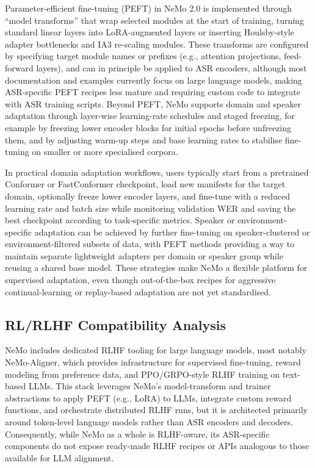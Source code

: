 \documentclass[conference]{IEEEtran}
\begin{document}
Parameter-efficient fine-tuning (PEFT) in NeMo 2.0 is implemented through ``model transforms'' that wrap selected modules at the start of training, turning standard linear layers into LoRA-augmented layers or inserting Houlsby-style adapter bottlenecks and IA3 re-scaling modules.
These transforms are configured by specifying target module names or prefixes (e.g., attention projections, feed-forward layers), and can in principle be applied to ASR encoders, although most documentation and examples currently focus on large language models, making ASR-specific PEFT recipes less mature and requiring custom code to integrate with ASR training scripts.
Beyond PEFT, NeMo supports domain and speaker adaptation through layer-wise learning-rate schedules and staged freezing, for example by freezing lower encoder blocks for initial epochs before unfreezing them, and by adjusting warm-up steps and base learning rates to stabilise fine-tuning on smaller or more specialised corpora.

In practical domain adaptation workflows, users typically start from a pretrained Conformer or FastConformer checkpoint, load new manifests for the target domain, optionally freeze lower encoder layers, and fine-tune with a reduced learning rate and batch size while monitoring validation WER and saving the best checkpoint according to task-specific metrics.
Speaker or environment-specific adaptation can be achieved by further fine-tuning on speaker-clustered or environment-filtered subsets of data, with PEFT methods providing a way to maintain separate lightweight adapters per domain or speaker group while reusing a shared base model.
These strategies make NeMo a flexible platform for supervised adaptation, even though out-of-the-box recipes for aggressive continual-learning or replay-based adaptation are not yet standardised.

\subsection{RL/RLHF Compatibility Analysis}

NeMo includes dedicated RLHF tooling for large language models, most notably NeMo-Aligner, which provides infrastructure for supervised fine-tuning, reward modeling from preference data, and PPO/GRPO-style RLHF training on text-based LLMs.
This stack leverages NeMo’s model-transform and trainer abstractions to apply PEFT (e.g., LoRA) to LLMs, integrate custom reward functions, and orchestrate distributed RLHF runs, but it is architected primarily around token-level language models rather than ASR encoders and decoders.
Consequently, while NeMo as a whole is RLHF-aware, its ASR-specific components do not expose ready-made RLHF recipes or APIs analogous to those available for LLM alignment.
\end{document}
